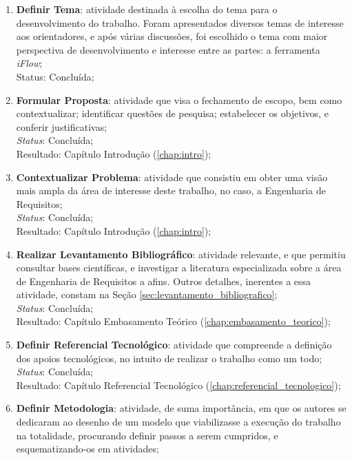 \begin{enumerate}
    \item \textbf{Definir Tema}: atividade destinada à escolha do tema para o desenvolvimento do trabalho. Foram apresentados diversos temas de interesse aos orientadores, e após várias discussões, foi escolhido o tema com maior perspectiva de desenvolvimento e interesse entre as partes: a ferramenta \textit{iFlow};
    \\
    Status: Concluída;
    \item \label{item:proposta} \textbf{Formular Proposta}: atividade que visa o fechamento de escopo, bem como contextualizar; identificar questões de pesquisa; estabelecer os objetivos, e conferir justificativas;
    \\
    \textit{Status}: Concluída;
    \\
    Resultado: Capítulo Introdução (\ref{chap:intro});
    \item \textbf{Contextualizar Problema}: atividade que consistiu em obter uma visão mais ampla da área de interesse deste trabalho, no caso, a Engenharia de Requisitos;
    \\
    \textit{Status}: Concluída;
    \\
    Resultado: Capítulo Introdução (\ref{chap:intro});
    \item \textbf{Realizar Levantamento Bibliográfico}: atividade relevante, e que permitiu consultar bases científicas, e investigar a literatura especializada sobre a área de Engenharia de Requisitos a afins. Outros detalhes, inerentes a essa atividade, constam na Seção \ref{sec:levantamento_bibliografico};
    \\
    \textit{Status}: Concluída;
    \\
    Resultado: Capítulo Embasamento Teórico (\ref{chap:embasamento_teorico});
    \item \textbf{Definir Referencial Tecnológico}: atividade que compreende a definição dos apoios tecnológicos, no intuito de realizar o trabalho como um todo;
    \\
    \textit{Status}: Concluída;
    \\
    Resultado: Capítulo Referencial Tecnológico (\ref{chap:referencial_tecnologico});
    \item \textbf{Definir Metodologia}: atividade, de suma importância, em que os autores se dedicaram ao desenho de um modelo que viabilizasse a execução do trabalho na totalidade, procurando definir passos a serem cumpridos, e esquematizando-os em atividades;
    \\

\end{enumerate}
